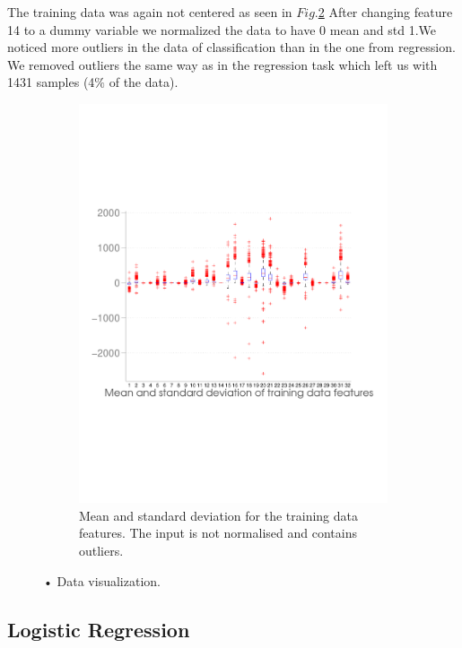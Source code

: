 The training data was again not centered as seen in $Fig.$\ref{fig:dist_classification}
 After changing feature 14 to a dummy variable we normalized the data to have 0 mean and std 1.We noticed more outliers in the data of classification than in the one from regression. We removed outliers the same way as in the regression task which left us with 1431 samples (4$\%$ of the data).
\begin{figure}[h]
  \begin{subfigure}[b]{0.5\textwidth}
   \includegraphics[width=\textwidth]{figures/classification_distribution.pdf}
    \caption{Mean and standard deviation for the training data features. The input is not normalised and contains outliers.}
    \label{fig:dist_classification}
  \end{subfigure}
  \caption{• Data visualization. }
\end{figure}

\subsection{Logistic Regression}

